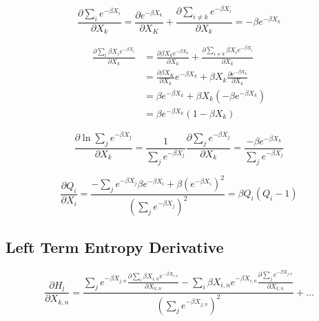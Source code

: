 \begin{equation} \label{dex}
    \frac{\partial \sum_{i}e^{-\beta X_{i}}}{\partial X_{k}} = \frac{\partial e^{-\beta X_{k}}}{\partial X_{K}} + \frac{\partial \sum_{i \ne k} e^{-\beta X_{i}}}{\partial X_{k}} = -\beta e^{-\beta X_{k}}
\end{equation}

\begin{equation} \label{dxex}
\begin{aligned} 
    \frac{\partial \sum_{i}\beta X_{i} e^{-\beta X_{i}}}{\partial X_{k}} 
    &= \frac{\partial \beta X_{k} e^{-\beta X_{k}}}{\partial X_{k}} + \frac{\partial \sum_{i \ne k} \beta X_{i} e^{-\beta X_{i}}}{\partial X_{k}} \\
    &= \frac{\partial \beta X_{K}}{\partial X_{k}} e^{-\beta X_{k}} + \beta X_{k} \frac{\partial e^{-\beta X_{k}}}{\partial X_{k}}\\
    &= \beta e^{-\beta X_{k}} + \beta X_{k} (-\beta e^{-\beta X_{k}})\\
    &= \beta e^{-\beta X_{k}}(1 - \beta X_{k})
\end{aligned}
\end{equation}

\begin{equation} \label{dlne}
    \frac{\partial \ln{\sum_{j} e^{-\beta X_{j}}}}{\partial X_{k}} = \frac{1}{\sum_{j} e^{-\beta X_{j}}} \frac{\partial \sum_{j} e^{-\beta X_{j}}}{\partial X_{k}} = \frac{-\beta e^{-\beta X_{k}}}{\sum_{j}e^{-\beta X_{j}}}
\end{equation}

\begin{equation} \label{qderiv}
    \frac{\partial Q_{i}}{\partial X_{i}} = \frac{-\sum_{j} e^{-\beta X_{j}} \beta e^{-\beta X_{i}} + \beta (e^{-\beta X_{i}})^2} {(\sum_{j}e^{-\beta X_{j}})^2} = \beta Q_{i} \left(Q_{i} - 1\right)
\end{equation}

\subsection{Left Term Entropy Derivative}


\begin{displaymath}
    \frac{\partial H_{l}}{\partial X_{k,n}} =
    \frac{\sum_{j}e^{-\beta X_{j,n}}\frac{\partial\sum_{i}\beta X_{i,n} e^{-\beta X_{i,n}}}{\partial X_{k,n}}
    - \sum_{i}\beta X_{i,n} e^{-\beta X_{i,n}}\frac{\partial\sum_{j}e^{-\beta X_{j,n}}}{\partial X_{k,n}}}{\left(\sum_{j}e^{-\beta X_{j,n}}\right)^{2}}
    + \ldots
\end{displaymath}

